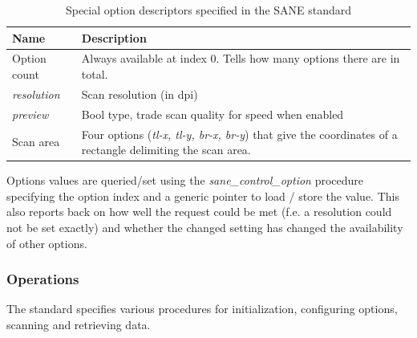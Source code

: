 \documentclass{article}
\begin{document}
\begin{table}[H]
  \caption{Special option descriptors specified in the SANE standard \cite[4.5]{sane_standard}}
  \centering
  \begin{tabularx}{\textwidth}{l | X}
    Name & Description \\ \hline
      Option count & Always available at index 0. Tells how many options
                            there are in total. \\
      {\it resolution} & Scan resolution (in dpi) \\
      {\it preview} & Bool type, trade scan quality for speed when enabled \\
      Scan area & Four options ({\it tl-x, tl-y, br-x, br-y}) that give
                  the coordinates of a rectangle delimiting the scan area. \\
  \end{tabularx}
\end{table} 

Options values are queried/set using the {\it sane\_control\_option} procedure
specifying the option index and a generic pointer to load / store the value.
This also reports back on how well the request could be met (f.e. a resolution could
not be set exactly) and whether the changed setting has changed the availability
of other options. \cite[4.4]{sane_standard}

\subsubsection{Operations}

The standard specifies various procedures for initialization, configuring options,
scanning and retrieving data.
\end{document}

